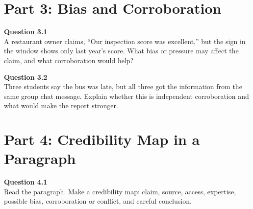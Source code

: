 \documentclass[12pt]{article}
\begin{document}

\newpage

\section*{Part 3: Bias and Corroboration}

\textbf{Question 3.1}\\[-0.15em]
A restaurant owner claims, ``Our inspection score was excellent,'' but the sign in the window shows only last year's score. What bias or pressure may affect the claim, and what corroboration would help?


\textbf{Question 3.2}\\[-0.15em]
Three students say the bus was late, but all three got the information from the same group chat message. Explain whether this is independent corroboration and what would make the report stronger.


\newpage

\section*{Part 4: Credibility Map in a Paragraph}

\textbf{Question 4.1}\\[-0.15em]
Read the paragraph. Make a credibility map: claim, source, access, expertise, possible bias, corroboration or conflict, and careful conclusion.

\vspace{0.2em}

\noindent{}
\end{document}
